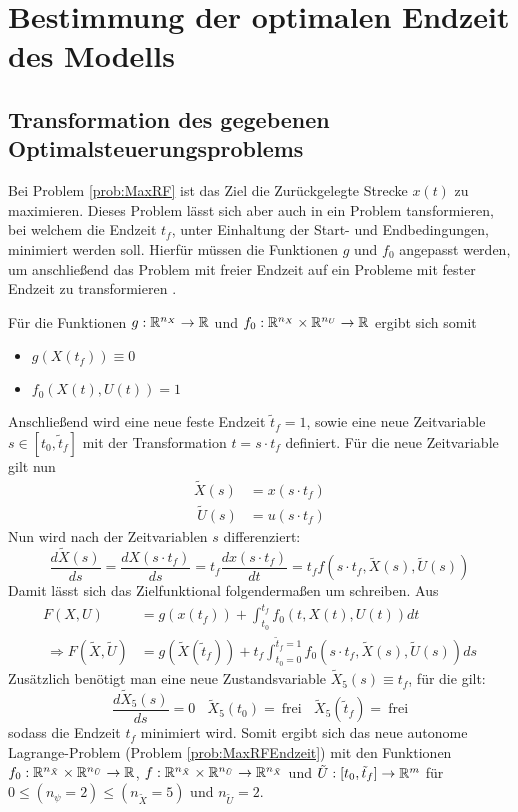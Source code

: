 \chapter{Bestimmung der optimalen Endzeit des Modells}\label{kap:OptTf}

\section{Transformation des gegebenen Optimalsteuerungsproblems}
Bei Problem \ref{prob:MaxRF} ist das Ziel die Zurückgelegte Strecke $x(t)$ zu maximieren. Dieses Problem lässt sich aber auch in ein Problem tansformieren, bei welchem die Endzeit $t_f$, unter Einhaltung der Start- und Endbedingungen, minimiert werden soll. Hierfür müssen die Funktionen $g$ und $f_0$ angepasst werden, um anschließend das Problem mit freier Endzeit auf ein Probleme mit fester Endzeit zu transformieren \cite{Gerdts2011}.

Für die Funktionen $g : \mathbb{R}^{n_X} \to \mathbb{R}$ und $f_0 : \mathbb{R}^{n_X} \times \mathbb{R}^{n_U} \to \mathbb{R}$ ergibt sich somit
\begin{itemize}
\item $g(X(t_f)) \equiv 0$
%
\item $f_0(X(t),U(t)) = 1$ 
\end{itemize}
Anschließend wird eine neue feste Endzeit $\tilde{t}_f = 1$, sowie eine neue Zeitvariable $s \in [t_0,\tilde{t}_f]$ mit der Transformation $t = s \cdot t_f$ definiert. Für die neue Zeitvariable gilt nun
\[\begin{split}
\tilde{X}(s) &= x(s \cdot t_f) \\\
\tilde{U}(s) &= u(s \cdot t_f)
\end{split}\] 
Nun wird nach der Zeitvariablen $s$ differenziert:
\[\dfrac{d \tilde{X}(s)}{ds} = \dfrac{d X(s \cdot t_f)}{ds} = t_f \dfrac{d x(s \cdot t_f)}{dt} = t_f f(s \cdot t_f,\tilde{X}(s),\tilde{U}(s)) \]
Damit lässt sich das Zielfunktional folgendermaßen um schreiben. Aus
\[\begin{split}
F(X,U) &= g(x(t_f)) + \int^{t_f}_{t_0} f_0(t,X(t),U(t)) dt \\\
\Rightarrow F(\tilde{X},\tilde{U}) &= g(\tilde{X}(\tilde{t}_f)) + t_f \int^{\tilde{t}_f = 1}_{t_0 = 0} f_0(s \cdot t_f,\tilde{X}(s),\tilde{U}(s)) ds 
\end{split}\]
Zusätzlich benötigt man eine neue Zustandsvariable $\tilde{X}_5(s) \equiv t_f$, für die gilt: \[\dfrac{d \tilde{X}_5(s)}{ds} = 0 \ \ \ \ \tilde{X}_5(t_0) =\ \text{frei} \ \ \ \ \tilde{X}_5(\tilde{t}_f) =\ \text{frei}\] sodass die Endzeit $t_f$ minimiert wird. Somit ergibt sich das neue autonome Lagrange-Problem (Problem \ref{prob:MaxRFEndzeit}) mit den Funktionen $f_0 : \mathbb{R}^{n_{\tilde{X}}} \times \mathbb{R}^{n_{\tilde{U}}} \to \mathbb{R}$, $f : \mathbb{R}^{n_{\tilde{X}}} \times \mathbb{R}^{n_{\tilde{U}}} \to \mathbb{R}^{n_{\tilde{X}}}$ und $\tilde{U} : [t_0,\tilde{t}_f] \to \mathbb{R}^m$ für $0 \leq (n_{\psi} = 2) \leq (n_{\tilde{X}} = 5)$ und $n_{\tilde{U}} = 2$.

